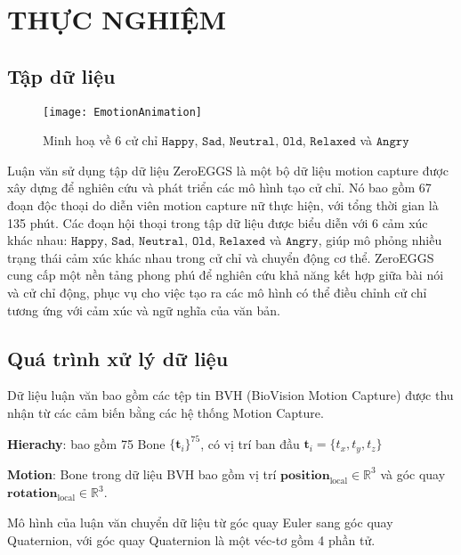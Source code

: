\chapter{THỰC NGHIỆM}
\label{Chapter4}

\section{Tập dữ liệu}

\setcounter{figure}{12}
\begin{figure}
	\centering
	\texttt{[image: EmotionAnimation]}
	\caption{Minh hoạ về 6 cử chỉ $\texttt{Happy}$, $\texttt{Sad}$, $\texttt{Neutral}$, $\texttt{Old}$, $\texttt{Relaxed}$ và $\texttt{Angry}$}
\end{figure}

Luận văn sử dụng tập dữ liệu ZeroEGGS \cite{ghorbani2022zeroeggszeroshotexamplebasedgesture} là một bộ dữ liệu motion capture được xây dựng để nghiên cứu và phát triển các mô hình tạo cử chỉ. Nó bao gồm 67 đoạn độc thoại do diễn viên motion capture nữ thực hiện, với tổng thời gian là 135 phút. Các đoạn hội thoại trong tập dữ liệu được biểu diễn với 6 cảm xúc khác nhau: $\texttt{Happy}$, $\texttt{Sad}$, $\texttt{Neutral}$, $\texttt{Old}$, $\texttt{Relaxed}$ và $\texttt{Angry}$, giúp mô phỏng nhiều trạng thái cảm xúc khác nhau trong cử chỉ và chuyển động cơ thể. ZeroEGGS cung cấp một nền tảng phong phú để nghiên cứu khả năng kết hợp giữa bài nói và cử chỉ động, phục vụ cho việc tạo ra các mô hình có thể điều chỉnh cử chỉ tương ứng với cảm xúc và ngữ nghĩa của văn bản.

\section{Quá trình xử lý dữ liệu}

Dữ liệu luận văn bao gồm các tệp tin BVH (BioVision Motion Capture) được thu nhận từ các cảm biến bằng các hệ thống Motion Capture. 


\textbf{Hierachy}: bao gồm 75 Bone $\{ \mathbf{t}_i \}^{75} $, có vị trí ban đầu  $\mathbf{t}_{i} = \{t_x, t_y, t_z\}$


\vspace{5pt}


\textbf{Motion}:
Bone trong dữ liệu BVH bao gồm vị trí $\mathbf{position}_{\operatorname{local}}  \in \mathbb{R}^{3}$ và góc quay $\mathbf{rotation}_{\operatorname{local}} \in \mathbb{R}^{3}$.

Mô hình của luận văn chuyển dữ liệu từ góc quay Euler sang góc quay Quaternion, với góc quay Quaternion là một véc-tơ gồm 4 phần tử.


